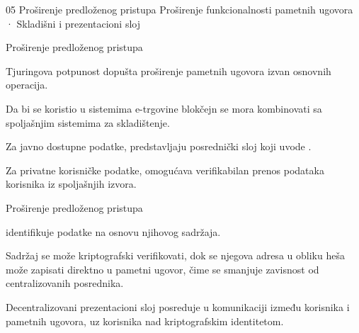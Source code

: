 \sectionframe
    {05}
    {Proširenje predloženog pristupa}
    {Proširenje funkcionalnosti pametnih ugovora · Skladišni i prezentacioni sloj}


\begin{frame}{Proširenje predloženog pristupa}

Tjuringova potpunost dopušta proširenje pametnih ugovora izvan osnovnih operacija.


Da bi se koristio u sistemima e-trgovine blokčejn se mora kombinovati sa spoljašnjim sistemima za skladištenje.

Za javno dostupne podatke,  predstavljaju posrednički sloj koji uvode .

Za privatne korisničke podatke,  omogućava verifikabilan prenos podataka korisnika iz spoljašnjih izvora.


\end{frame}


\begin{frame}{Proširenje predloženog pristupa}


 identifikuje podatke na osnovu njihovog sadržaja.

Sadržaj se može kriptografski verifikovati, dok se njegova adresa u obliku heša može zapisati direktno u pametni ugovor, čime se smanjuje zavisnost od centralizovanih posrednika.

Decentralizovani prezentacioni sloj posreduje u komunikaciji između korisnika i pametnih ugovora, uz  korisnika nad kriptografskim identitetom.


\end{frame}

